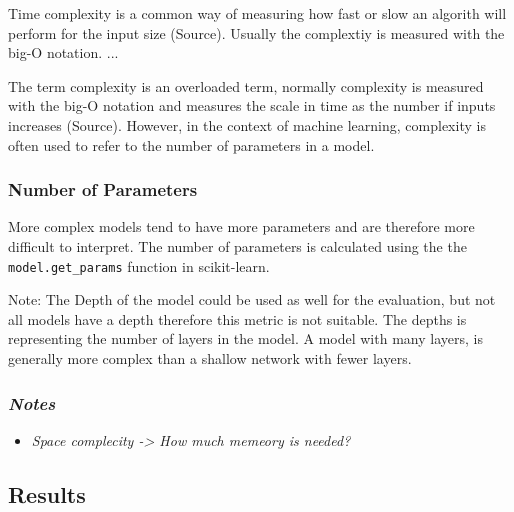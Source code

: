 Time complexity is a common way of measuring how fast or slow an algorith will perform for the
input size (Source). Usually the complextiy is measured with the big-O notation.
...

The term complexity is an overloaded term, normally complexity is measured with the big-O
notation and measures the scale in time as the number if inputs increases (Source).
However, in the context of machine learning, complexity is often used to refer to the
number of parameters in a model.

\subsubsection*{Number of Parameters}
More complex models tend to have more parameters and are therefore more difficult to interpret.
The number of parameters is calculated using the the \texttt{model.get\_params} function
in scikit-learn.

Note: The Depth of the model could be used as well for the evaluation, but not all models have a
depth therefore this metric is not suitable.
The depths is representing the number of layers in the model.
A model with many layers, is generally more complex than a shallow network with fewer layers.

\subsubsection*{\textit{Notes}}

\begin{itemize}
    \item \textit{Space complecity -> How much memeory is needed?}
\end{itemize}

\subsection{Results}\label{subsec:results2}

